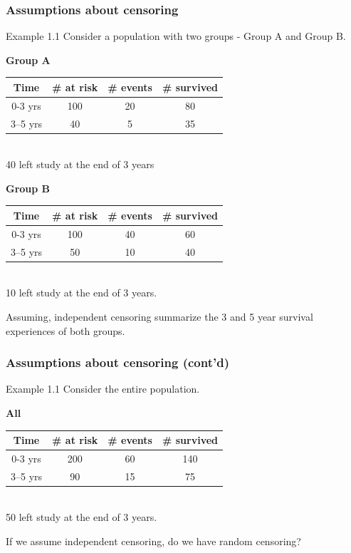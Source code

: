 \documentclass{beamer}
\theoremstyle{definition}
\begin{document}
\begin{frame}
\frametitle{Assumptions about censoring}
\begin{block}{Example 1.1}
Consider a population with two groups - Group A and Group B.
\begin{center}
\textbf{Group A}
\begin{tabular}{ c c c c }
 Time & \# at risk & \# events & \# survived \\ \hline
 0-3 yrs & 100 & 20 & 80 \\
 3–5 yrs &  40 & 5 & 35
\end{tabular} \\
40 left study at the end of 3 years
\end{center}
\begin{center}
\textbf{Group B}
\begin{tabular}{ c c c c }
 Time & \# at risk & \# events & \# survived \\ \hline
 0-3 yrs & 100 & 40 & 60 \\
 3–5 yrs &  50 & 10 & 40
\end{tabular} \\
10 left study at the end of 3 years.
\end{center}
\end{block}
Assuming, independent censoring summarize the 3 and 5 year survival experiences of both groups.
\end{frame}

\begin{frame}
\frametitle{Assumptions about censoring (cont'd)}
\begin{block}{Example 1.1}
Consider the entire population.
\begin{center}
\textbf{All}
\begin{tabular}{ c c c c }
 Time & \# at risk & \# events & \# survived \\ \hline
 0-3 yrs & 200 & 60 & 140 \\
 3–5 yrs &  90 & 15 & 75
\end{tabular} \\
50 left study at the end of 3 years.
\end{center}
\end{block}
If we assume independent censoring, do we have random censoring?
\end{frame}
\end{document}
